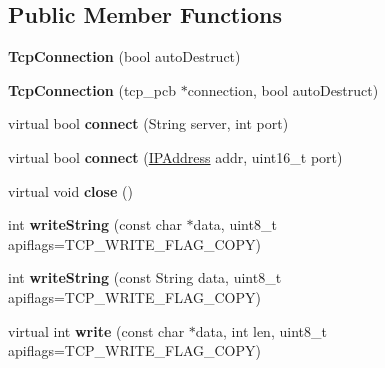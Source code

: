 \subsection*{Public Member Functions}
\begin{DoxyCompactItemize}
\item 
\hypertarget{class_tcp_connection_a6cda2bd2cfedc12cd0fcfbc47df5cec0}{}{\bfseries Tcp\+Connection} (bool auto\+Destruct)\label{class_tcp_connection_a6cda2bd2cfedc12cd0fcfbc47df5cec0}

\item 
\hypertarget{class_tcp_connection_a936b499d010ead10fdcf73aa4b50ad00}{}{\bfseries Tcp\+Connection} (tcp\+\_\+pcb $\ast$connection, bool auto\+Destruct)\label{class_tcp_connection_a936b499d010ead10fdcf73aa4b50ad00}

\item 
\hypertarget{class_tcp_connection_a349069802d8743ab29024b755424773e}{}virtual bool {\bfseries connect} (String server, int port)\label{class_tcp_connection_a349069802d8743ab29024b755424773e}

\item 
\hypertarget{class_tcp_connection_ae7b39dfc9d8627c7782f6e434058fff1}{}virtual bool {\bfseries connect} (\hyperlink{class_i_p_address}{I\+P\+Address} addr, uint16\+\_\+t port)\label{class_tcp_connection_ae7b39dfc9d8627c7782f6e434058fff1}

\item 
\hypertarget{class_tcp_connection_a19d2aae1831da848f13f8fc6101e40ee}{}virtual void {\bfseries close} ()\label{class_tcp_connection_a19d2aae1831da848f13f8fc6101e40ee}

\item 
\hypertarget{class_tcp_connection_a3d6b422ffcb3718c74477d9140288edb}{}int {\bfseries write\+String} (const char $\ast$data, uint8\+\_\+t apiflags=T\+C\+P\+\_\+\+W\+R\+I\+T\+E\+\_\+\+F\+L\+A\+G\+\_\+\+C\+O\+P\+Y)\label{class_tcp_connection_a3d6b422ffcb3718c74477d9140288edb}

\item 
\hypertarget{class_tcp_connection_a5165ea409d9d30a227f2aa76a0669948}{}int {\bfseries write\+String} (const String data, uint8\+\_\+t apiflags=T\+C\+P\+\_\+\+W\+R\+I\+T\+E\+\_\+\+F\+L\+A\+G\+\_\+\+C\+O\+P\+Y)\label{class_tcp_connection_a5165ea409d9d30a227f2aa76a0669948}

\item 
\hypertarget{class_tcp_connection_a3dca7b769bc01da34f881748de98d3f9}{}virtual int {\bfseries write} (const char $\ast$data, int len, uint8\+\_\+t apiflags=T\+C\+P\+\_\+\+W\+R\+I\+T\+E\+\_\+\+F\+L\+A\+G\+\_\+\+C\+O\+P\+Y)\label{class_tcp_connection_a3dca7b769bc01da34f881748de98d3f9}


\end{DoxyCompactItemize}
